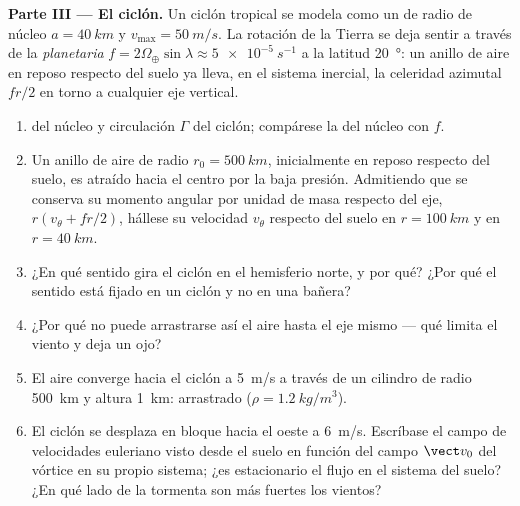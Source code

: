 \begin{problem}
\medskip
\noindent\textbf{Parte III --- El ciclón.}
Un ciclón tropical se modela como un  de radio de núcleo
$a = \qty{40}{km}$ y $v_{\max} = \qty{50}{m/s}$. La rotación de la Tierra se
deja sentir a través de la \emph{ planetaria} $f = 2\Omega_\oplus\sin\lambda
\approx \qty{5e-5}{s^{-1}}$ a la latitud \qty{20}{\degree}: un anillo de aire
en reposo respecto del suelo ya lleva, en el sistema inercial, la
celeridad azimutal $fr/2$ en torno a cualquier eje vertical.
\begin{enumerate}[resume]
  \item {} del núcleo y circulación $\Gamma$ del ciclón;
        compárese la  del núcleo con $f$.
  \item Un anillo de aire de radio $r_0 = \qty{500}{km}$, inicialmente en
        reposo respecto del suelo, es atraído hacia el centro por la baja
        presión. Admitiendo que se conserva su momento angular por unidad
        de masa respecto del eje, $r(v_\theta + fr/2)$, hállese su
        velocidad $v_\theta$ respecto del suelo en $r = \qty{100}{km}$
        y en $r = \qty{40}{km}$.
  \item ¿En qué sentido gira el ciclón en el hemisferio norte, y por qué?
        ¿Por qué el sentido está fijado en un ciclón y no en una bañera?
  \item ¿Por qué no puede arrastrarse así el aire hasta el eje mismo
        --- qué limita el viento y deja un ojo?
  \item El aire converge hacia el ciclón a \qty{5}{m/s} a través de un
        cilindro de radio \qty{500}{km} y altura \qty{1}{km}:  arrastrado ($\rho = \qty{1.2}{kg/m^3}$).
  \item El ciclón se desplaza en bloque hacia el oeste a \qty{6}{m/s}.
        Escríbase el campo de velocidades euleriano visto desde el suelo
        en función del campo $\vect v_0$ del vórtice en su propio
        sistema; ¿es estacionario el flujo en el sistema del suelo? ¿En
        qué lado de la tormenta son más fuertes los vientos?
\end{enumerate}


\end{problem}
